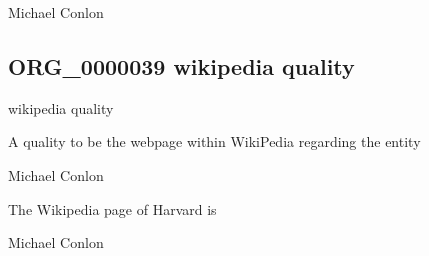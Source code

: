 \documentclass[letterpaper,10pt,english]{sphinxmanual}
\begin{document}
\begin{sphinxShadowBox}

\sphinxAtStartPar
Michael Conlon 
\end{sphinxShadowBox}
\begin{quote}

\ignorespaces \end{quote}


\subsection{ORG\_0000039 \sphinxhyphen{} wikipedia quality}
\label{\detokenize{doc-ORG_0000039:org-0000039-wikipedia-quality}}\label{\detokenize{doc-ORG_0000039:index-0}}\label{\detokenize{doc-ORG_0000039::doc}}
\begin{sphinxShadowBox}

\sphinxAtStartPar
wikipedia quality
\end{sphinxShadowBox}

\begin{sphinxShadowBox}

\sphinxAtStartPar
A quality to be the webpage within WikiPedia regarding the entity
\end{sphinxShadowBox}

\begin{sphinxShadowBox}

\sphinxAtStartPar
Michael Conlon 
\end{sphinxShadowBox}

\begin{sphinxShadowBox}

\sphinxAtStartPar
The Wikipedia page of Harvard is 
\end{sphinxShadowBox}

\begin{sphinxShadowBox}

\sphinxAtStartPar
Michael Conlon 
\end{sphinxShadowBox}
\begin{quote}

\ignorespaces \end{quote}
\end{document}
